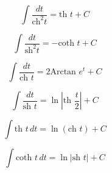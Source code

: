 \documentclass[class=report,crop=false]{standalone}
\begin{document}
\begin{multicols}{2}
$$\int \frac{dt}{\text{ch}^2 t} = \text{th } t +C$$

$$\int \frac{dt}{\text{sh}^2 t} = -\text{coth } t +C$$

$$\int \frac{dt}{\text{ch } t} = 2\text{Arctan }e^t +C$$

\vspace{2mm}

$$\int \frac{dt}{\text{sh } t} = \ln \left| \text{th } \frac{t}{2} \right| +C$$

$$\int \text{th } t \, dt =  \ln \left( \text{ch } t \right) +C$$

$$\int \text{coth } t \, dt = \ln \left| \text{sh } t \right| +C$$
\end{multicols}



\finchapitre
\end{document}
